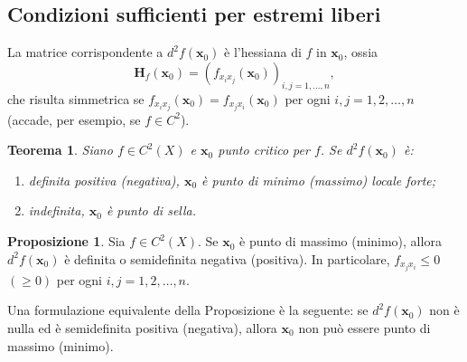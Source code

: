 \documentclass[a4paper]{book}
\numberwithin{equation}{section}
\theoremstyle{plain}
\newtheorem{teor}{Teorema}[section]
\theoremstyle{definition}
\newtheorem{prop}{Proposizione}[section]
\theoremstyle{remark}
\renewcommand{\vec}{\boldsymbol}
\theoremstyle{example}
\begin{document}
	\subsection{Condizioni sufficienti per estremi liberi}
	La matrice corrispondente a $d^2f(\vec{x}_0)$ è l'hessiana di $f$ in $\vec{x}_0$, ossia
	\begin{equation*}
		\mathbf{H}_f(\vec{x}_0) = (f_{x_ix_j}(\vec{x}_0))_{i,j = 1, \dots, n},
	\end{equation*}
	che risulta simmetrica se $f_{x_ix_j}(\vec{x}_0) = f_{x_jx_i}(\vec{x}_0)$ per ogni $i,j = 1, 2, \dots, n$ (accade, per esempio, se $f \in C^2$).

	\begin{teor}
		Siano $f \in C^2(X)$ e $\vec{x}_0$ punto critico per $f$. Se $d^2f(\vec{x}_0)$ è:
		\begin{enumerate}
			\item definita positiva (negativa), $\vec{x}_0$ è punto di minimo (massimo) locale forte;
			\item indefinita, $\vec{x}_0$ è punto di sella.
		\end{enumerate}
	\end{teor}

	\begin{prop}
		Sia $f \in C^2(X)$. Se $\vec{x}_0$ è punto di massimo (minimo), allora $d^2f(\vec{x}_0)$ è definita o semidefinita negativa (positiva). In particolare, $f_{x_jx_i} \le 0$ $(\ge 0)$ per ogni $i,j = 1, 2, \dots, n$.
	\end{prop}

	Una formulazione equivalente della Proposizione è la seguente: se $d^2f(\vec{x}_0)$ non è nulla ed è semidefinita positiva (negativa), allora $\vec{x}_0$ non può essere punto di massimo (minimo).
\end{document}
